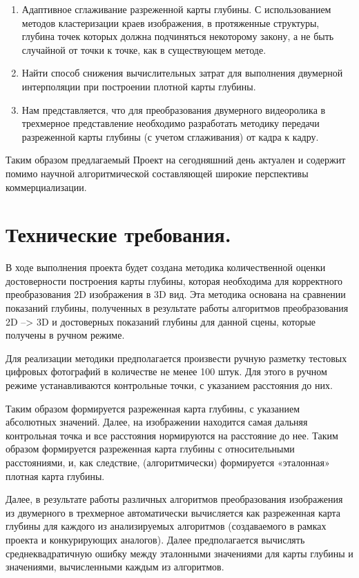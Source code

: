 \begin{enumerate}
	\item Адаптивное сглаживание разреженной карты глубины.  С использованием методов кластеризации краев изображения, в протяженные структуры, глубина точек которых должна подчиняться некоторому закону, а не быть случайной от точки к точке, как в существующем методе. 
	\item Найти способ снижения вычислительных затрат для выполнения двумерной интерполяции при построении плотной карты глубины. 
	\item Нам представляется, что для преобразования двумерного видеоролика в трехмерное представление необходимо разработать методику передачи разреженной карты глубины (с учетом сглаживания) от кадра к кадру. 
\end{enumerate}

Таким образом предлагаемый Проект на сегодняшний день актуален и содержит помимо научной алгоритмической составляющей широкие перспективы коммерциализации.

\section{Технические требования.}

В ходе выполнения проекта будет создана методика количественной оценки достоверности построения карты глубины, которая необходима для корректного преобразования 2D изображения в 3D вид. Эта методика основана на сравнении показаний глубины, полученных в результате работы алгоритмов преобразования 2D –> 3D и достоверных показаний глубины для данной сцены, которые получены в ручном режиме.

Для реализации методики предполагается произвести ручную разметку тестовых цифровых фотографий в количестве не менее 100 штук. Для этого в ручном режиме устанавливаются контрольные точки, с указанием расстояния до них.

Таким образом формируется разреженная карта глубины, с указанием абсолютных значений. Далее, на изображении находится самая дальняя контрольная точка и все расстояния нормируются на расстояние до нее. Таким образом формируется разреженная карта глубины с относительными расстояниями, и, как следствие, (алгоритмически) формируется «эталонная» плотная карта глубины.

Далее, в результате работы различных алгоритмов преобразования изображения из двумерного в трехмерное автоматически вычисляется как разреженная карта глубины для каждого из анализируемых алгоритмов (создаваемого в рамках проекта и конкурирующих аналогов). Далее предполагается вычислять среднеквадратичную ошибку между эталонными значениями для карты глубины и значениями, вычисленными каждым из алгоритмов.


